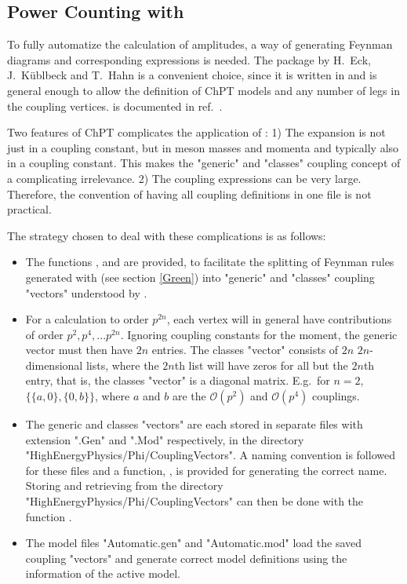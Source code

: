 \subsection{Power Counting with \fa}

To fully automatize the calculation of amplitudes, a way of generating Feynman diagrams and
corresponding expressions  is needed. The package \fa by H.~Eck, J.~K\"ublbeck and T.~Hahn
is a convenient choice, since it is written in \mma
and is general enough to allow the definition of ChPT models and any number of legs in the
coupling vertices. \fa is documented in ref.~.

Two features of ChPT complicates the application of \fa:
1) The expansion is not just in a coupling constant, but in meson masses and momenta and
typically also in a coupling constant.
This makes the "generic" and "classes" coupling concept of \fa a complicating irrelevance.
2) The coupling expressions can be very large. Therefore, the \fa convention of having all
coupling definitions in one file is not practical.

The strategy chosen to deal with these complications is as follows:
\begin{itemize}
\item The functions ,  and 
are provided, to facilitate the splitting of Feynman rules generated with
 (see section \ref{Green}) into "generic" and "classes" coupling "vectors"
understood by \fa.
\item For a calculation to order $p^{2 n}$, each vertex will in general have contributions of
order $p^2, p^4, ... p^{2 n}$. Ignoring coupling constants for the moment, the generic vector must
then have $2 n$ entries. The classes "vector" consists of $2 n$ $2 n$-dimensional lists,
where the $2 n$th list will have zeros for all but the $2 n$th entry, that is, the classes
"vector" is a diagonal matrix. E.g.~for $n=2$, $\{\{a,0\},\{0,b\}\}$, where $a$ and $b$ are the
$\mathscr{O}(p^2)$ and $\mathscr{O}(p^4)$ couplings.
\item The generic and classes "vectors" are each stored in separate files with extension
".Gen" and ".Mod" respectively, in the directory "HighEnergyPhysics/Phi/CouplingVectors".
A naming convention is followed for these files and a
function, , is provided for generating the correct name.
Storing and retrieving from the directory "HighEnergyPhysics/Phi/CouplingVectors" can then
be done with the function .
\item The \fa model files "Automatic.gen" and "Automatic.mod" load the saved coupling "vectors"
and generate correct \fa model definitions using the information of the active \fphi model.
\end{itemize}

